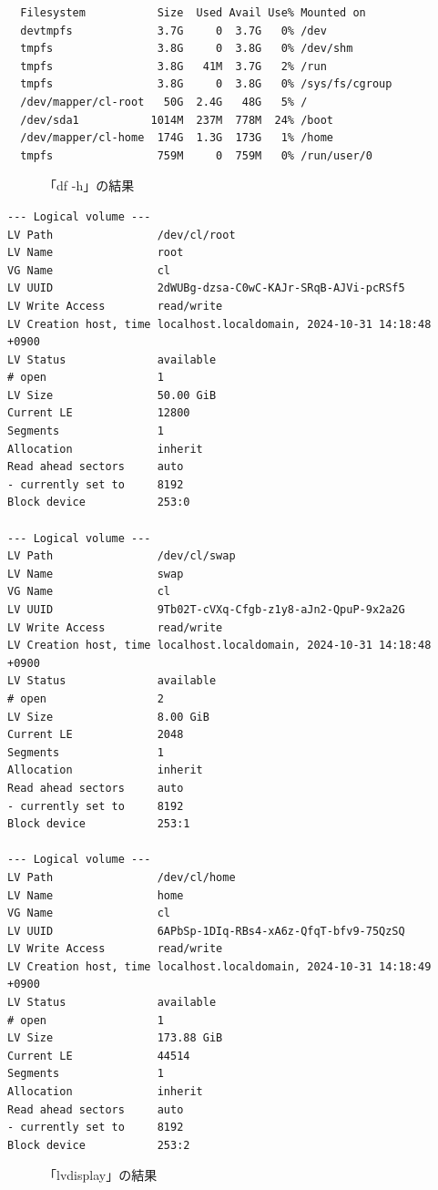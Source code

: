 \documentclass{ltjsarticle} %
\begin{document}
\begin{mdframed}
  \begin{verbatim}
  Filesystem           Size  Used Avail Use% Mounted on
  devtmpfs             3.7G     0  3.7G   0% /dev
  tmpfs                3.8G     0  3.8G   0% /dev/shm
  tmpfs                3.8G   41M  3.7G   2% /run
  tmpfs                3.8G     0  3.8G   0% /sys/fs/cgroup
  /dev/mapper/cl-root   50G  2.4G   48G   5% /
  /dev/sda1           1014M  237M  778M  24% /boot
  /dev/mapper/cl-home  174G  1.3G  173G   1% /home
  tmpfs                759M     0  759M   0% /run/user/0
  \end{verbatim}
  \end{mdframed}
  \begin{figure}[H]
  \caption{「df -h」の結果}
  \label{fig:df}
\end{figure}

\begin{mdframed}
  \begin{verbatim}
--- Logical volume ---
LV Path                /dev/cl/root
LV Name                root
VG Name                cl
LV UUID                2dWUBg-dzsa-C0wC-KAJr-SRqB-AJVi-pcRSf5
LV Write Access        read/write
LV Creation host, time localhost.localdomain, 2024-10-31 14:18:48 +0900
LV Status              available
# open                 1
LV Size                50.00 GiB
Current LE             12800
Segments               1
Allocation             inherit
Read ahead sectors     auto
- currently set to     8192
Block device           253:0

--- Logical volume ---
LV Path                /dev/cl/swap
LV Name                swap
VG Name                cl
LV UUID                9Tb02T-cVXq-Cfgb-z1y8-aJn2-QpuP-9x2a2G
LV Write Access        read/write
LV Creation host, time localhost.localdomain, 2024-10-31 14:18:48 +0900
LV Status              available
# open                 2
LV Size                8.00 GiB
Current LE             2048
Segments               1
Allocation             inherit
Read ahead sectors     auto
- currently set to     8192
Block device           253:1

--- Logical volume ---
LV Path                /dev/cl/home
LV Name                home
VG Name                cl
LV UUID                6APbSp-1DIq-RBs4-xA6z-QfqT-bfv9-75QzSQ
LV Write Access        read/write
LV Creation host, time localhost.localdomain, 2024-10-31 14:18:49 +0900
LV Status              available
# open                 1
LV Size                173.88 GiB
Current LE             44514
Segments               1
Allocation             inherit
Read ahead sectors     auto
- currently set to     8192
Block device           253:2
  \end{verbatim}
  \end{mdframed}
  \begin{figure}[H]
  \caption{「lvdisplay」の結果}
  \label{fig:lvdisplay}
\end{figure}
\end{document}
